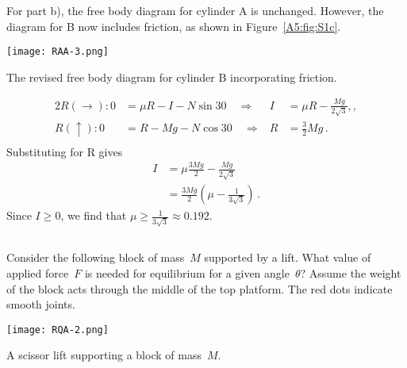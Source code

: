 \documentclass[a4paper,justified,oneside]{tufte-handout}
\numberwithin{equation}{subsection}
\begin{document}
\begin{solution}
\newpage
For part b), the free body diagram for cylinder A is unchanged. However, the diagram for B now includes friction, as shown in Figure~\ref{A5:fig:S1c}.
\begin{marginfigure}[0mm]
	\centering
	\texttt{[image: RAA-3.png]}
	\caption{The revised free body diagram for cylinder B incorporating friction.}
	\label{A5:fig:S1c}
\end{marginfigure}
\begin{alignat*}{2}
	R\left(\rightarrow\right):	0&=	\mu R - I - N\sin 30 \quad\Rightarrow&	I&=\mu R-\frac{Mg}{2\sqrt{3}},,\\
	R\left(\uparrow\right):	0&=R - Mg - N\cos 30	\quad\Rightarrow& R&=\frac{3}{2}Mg\,.\\
\end{alignat*}
Substituting for R gives
\begin{align*}
	I	&=\mu \frac{3Mg}{2} - \frac{Mg}{2\sqrt{3}}\\
	&=\frac{3Mg}{2}\left(\mu-\frac{1}{3\sqrt{3}}\right)\,.
\end{align*}
Since $I\geq 0$, we find that $\mu \geq \frac{1}{3\sqrt{3}}\approx \num{0.192}$.
\clearpage
\end{solution}

\subsection{}
Consider the following block of mass~$M$ supported by a lift. What value of applied force~$F$ is needed for equilibrium for a given angle~$\theta$? Assume the weight of the block acts through the middle of the top platform. The red dots indicate smooth joints.
\begin{marginfigure}[-10mm]
	\centering
	\texttt{[image: RQA-2.png]}
	\caption{A scissor lift supporting a block of mass~$M$.}
	\label{A5:fig:Q2}
\end{marginfigure}
\end{document}

